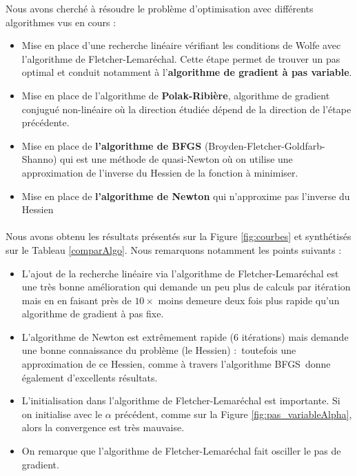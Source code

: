 \documentclass{article}
\begin{document}
    Nous avons cherché à résoudre le problème d'optimisation avec différents algorithmes vus en cours :
    \begin{itemize}
        \item Mise en place d'une recherche linéaire vérifiant les conditions de Wolfe avec l'algorithme de Fletcher-Lemaréchal. Cette étape permet de trouver un pas optimal et conduit notamment à l'\textbf{algorithme de gradient à pas variable}.
        \item Mise en place de l'algorithme de \textbf{Polak-Ribière}, algorithme de gradient conjugué non-linéaire où la direction étudiée dépend de la direction de l'étape précédente.
        \item Mise en place de \textbf{l'algorithme de BFGS} (Broyden-Fletcher-Goldfarb-Shanno) qui est une méthode de quasi-Newton où on utilise une approximation de l'inverse du Hessien de la fonction à minimiser.
        \item Mise en place de \textbf{l'algorithme de Newton} qui n'approxime pas l'inverse du Hessien
    \end{itemize}

    \paragraph{}Nous avons obtenu les résultats présentés sur la Figure \ref{fig:courbes} et synthétisés sur le Tableau \ref{comparAlgo}. Nous remarquons notamment les points suivants :
    \begin{itemize}
        \item L'ajout de la recherche linéaire via l'algorithme de Fletcher-Lemaréchal est une très bonne amélioration qui demande un peu plus de calculs par itération mais en en faisant près de $10\times$ moins demeure deux fois plus rapide qu'un algorithme de gradient à pas fixe.
        \item L'algorithme de Newton est extrêmement rapide (6 itérations) mais demande une bonne connaissance du problème (le Hessien) : toutefois une approximation de ce Hessien, comme à travers l'algorithme BFGS donne également d'excellents résultats.
        \item L'initialisation dans l'algorithme de Fletcher-Lemaréchal est importante. Si on initialise avec le $\alpha$ précédent, comme sur la Figure \ref{fig:pas_variableAlpha}, alors la convergence est très mauvaise.
        \item On remarque que l'algorithme de Fletcher-Lemaréchal fait osciller le pas de gradient.
    \end{itemize}
\end{document}
